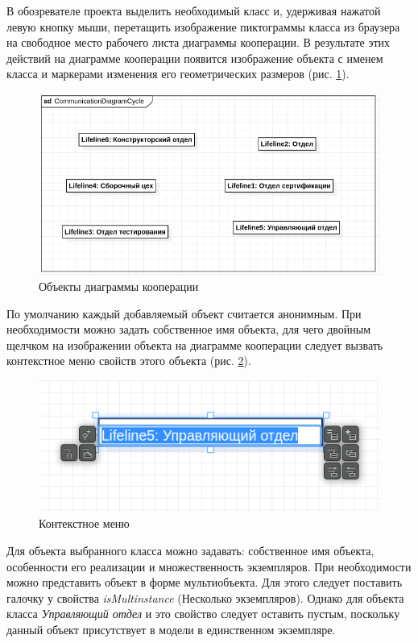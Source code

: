 \documentclass[a4paper,12pt]{extreport}
\begin{document}
В обозревателе проекта выделить необходимый класс и, удерживая нажатой левую кнопку мыши, перетащить изображение пиктограммы класса из браузера на свободное место рабочего листа диаграммы кооперации. В результате этих действий на диаграмме кооперации появится изображение объекта с именем класса и маркерами изменения его геометрических размеров (рис. \ref{fig:communicationfield}).

\begin{figure}[h!]
	\centering
	\includegraphics[width=0.7\linewidth]{images/communicationfield}
	\caption{Объекты диаграммы кооперации}
	\label{fig:communicationfield}
\end{figure}


По умолчанию каждый добавляемый объект считается анонимным. При необходимости можно задать собственное имя объекта, для чего двойным щелчком на изображении объекта на диаграмме кооперации следует вызвать контекстное меню свойств этого объекта (рис. \ref{fig:communicationobject}).

\begin{figure}[h!]
	\centering
	\includegraphics[width=0.6\linewidth]{images/communicationobject}
	\caption{Контекстное меню}
	\label{fig:communicationobject}
\end{figure}


Для объекта выбранного класса можно задавать: собственное имя объекта, особенности его реализации и множественность экземпляров.
\label{multinstance}
При необходимости можно представить объект в форме мультиобъекта. Для этого следует поставить галочку у свойства \textit{isMultinstance } (Несколько экземпляров). Однако для объекта класса \textit{Управляющий отдел} и это свойство следует оставить пустым, поскольку данный объект присутствует в модели в единственном экземпляре.
\end{document}

